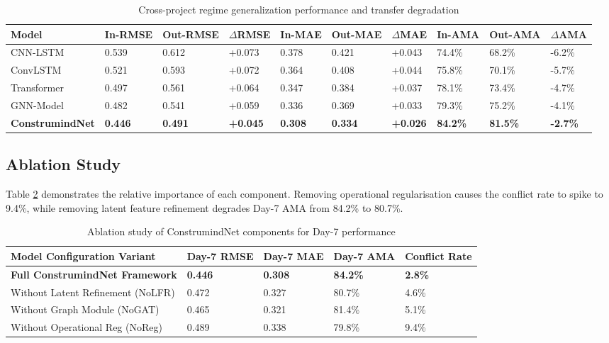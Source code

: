 \documentclass[11pt,a4paper]{article}
\begin{document}
\begin{table}[t]
\centering
\small
\caption{Cross-project regime generalization performance and transfer degradation}\label{tab:transfer}
\begin{tabular*}{\textwidth}{@{\extracolsep\fill}llllllllll@{\extracolsep\fill}}
\toprule
\textbf{Model} & \textbf{In-RMSE} & \textbf{Out-RMSE} & $\Delta$\textbf{RMSE} & \textbf{In-MAE} & \textbf{Out-MAE} & $\Delta$\textbf{MAE} & \textbf{In-AMA} & \textbf{Out-AMA} & $\Delta$\textbf{AMA} \\
\midrule
CNN-LSTM & 0.539 & 0.612 & +0.073 & 0.378 & 0.421 & +0.043 & 74.4\% & 68.2\% & -6.2\% \\
ConvLSTM & 0.521 & 0.593 & +0.072 & 0.364 & 0.408 & +0.044 & 75.8\% & 70.1\% & -5.7\% \\
Transformer & 0.497 & 0.561 & +0.064 & 0.347 & 0.384 & +0.037 & 78.1\% & 73.4\% & -4.7\% \\
GNN-Model & 0.482 & 0.541 & +0.059 & 0.336 & 0.369 & +0.033 & 79.3\% & 75.2\% & -4.1\% \\
\midrule
\textbf{ConstrumindNet} & \textbf{0.446} & \textbf{0.491} & \textbf{+0.045} & \textbf{0.308} & \textbf{0.334} & \textbf{+0.026} & \textbf{84.2\%} & \textbf{81.5\%} & \textbf{-2.7\%} \\
\bottomrule
\end{tabular*}
\end{table}

\subsection{Ablation Study}
Table \ref{tab:ablation} demonstrates the relative importance of each component. Removing operational regularisation causes the conflict rate to spike to 9.4\%, while removing latent feature refinement degrades Day-7 AMA from 84.2\% to 80.7\%.

\begin{table}[h]
\centering
\small
\caption{Ablation study of ConstrumindNet components for Day-7 performance}\label{tab:ablation}
\begin{tabular}{@{}lllll@{}}
\toprule
\textbf{Model Configuration Variant} & \textbf{Day-7 RMSE} & \textbf{Day-7 MAE} & \textbf{Day-7 AMA} & \textbf{Conflict Rate} \\
\midrule
\textbf{Full ConstrumindNet Framework} & \textbf{0.446} & \textbf{0.308} & \textbf{84.2\%} & \textbf{2.8\%} \\
Without Latent Refinement (NoLFR) & 0.472 & 0.327 & 80.7\% & 4.6\% \\
Without Graph Module (NoGAT) & 0.465 & 0.321 & 81.4\% & 5.1\% \\
Without Operational Reg (NoReg) & 0.489 & 0.338 & 79.8\% & 9.4\% \\
\bottomrule
\end{tabular}
\end{table}
\end{document}
